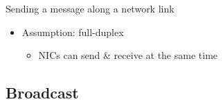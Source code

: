 \documentclass[xcolor={rgb,x11names,svgnames},rgb,x11names,svgnames]{beamer}
\begin{document}
\begin{frame}
\begin{block}{Sending a message along a network link}
\begin{itemize}
      \medskip

    \item Assumption: \alert{full-duplex}
      \begin{itemize}
      \item NICs can send \& receive at the same time
      \end{itemize}
    \end{itemize}
  \end{block}
\end{frame}


\subsection{Broadcast}
\end{document}
